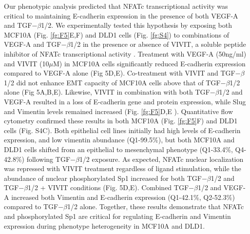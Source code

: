 \documentclass[12pt]{article}
\begin{document}
Our phenotypic analysis predicted that NFATc transcriptional activity was critical to maintaining E-cadherin expression in the presence of both VEGF-A and TGF$-\beta$1/2.
We experimentally tested this hypothesis by exposing both MCF10A (Fig. \ref{fg:F5}E,F) and DLD1 cells (Fig. \ref{fg:S4}) to combinations of VEGF-A and TGF$-\beta$1/2 in the presence or absence of VIVIT, a soluble peptide inhibitor of NFATc transcriptional activity \citep{Aramburu:1999if}.
Treatment with VEGF-A (50ng/ml) and VIVIT (10$\mu$M) in MCF10A cells significantly reduced E-cadherin expression compared to VEGF-A alone (Fig 5D,E).
Co-treatment with VIVIT and TGF$-\beta$1/2 did not enhance EMT capacity of MCF10A cells above that of TGF$-\beta$1/2 alone (Fig 5A,B,E).
Likewise, VIVIT in combination with both TGF$-\beta$1/2 and VEGF-A resulted in a loss of E-cadherin gene and protein expression, while Slug and Vimentin levels remained increased (Fig. \ref{fg:F5}D,E ).
Quantitative flow cytometry confirmed these results in both MCF10A (Fig. \ref{fg:F5}F) and DLD1 cells (Fig. S4C).
Both epithelial cell lines initially had high levels of E-cadherin expression, and low vimentin abundance (Q1-99.5\%), but both MCF10A and DLD1 cells shifted from an epithelial to mesenchymal phenotype (Q1-33.4\%, Q4-42.8\%) following TGF$-\beta$1/2 exposure.
As expected, NFATc nuclear localization was repressed with VIVIT treatment regardless of ligand stimulation, while the abundance of nuclear phosphorylated Sp1 increased for both TGF$-\beta$1/2 and TGF$-\beta$1/2 + VIVIT conditions (Fig. 5D,E).
Combined TGF$-\beta$1/2 and VEGF-A increased both Vimentin and E-cadherin expression (Q1-42.1\%, Q2-52.3\%) compared to TGF$-\beta$1/2 alone.
Together, these results demonstrate that NFATc and phosphorylated Sp1 are critical for regulating E-cadherin and Vimentin expression during phenotype heterogeneity in MCF10A and DLD1.
\end{document}

